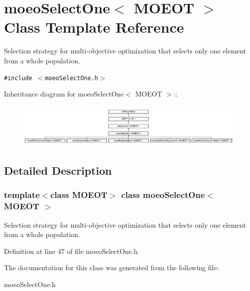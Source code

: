 \section{moeo\-Select\-One$<$ MOEOT $>$ Class Template Reference}
\label{classmoeoSelectOne}
Selection strategy for multi-objective optimization that selects only one element from a whole population.  


{\tt \#include $<$moeo\-Select\-One.h$>$}

Inheritance diagram for moeo\-Select\-One$<$ MOEOT $>$::\begin{figure}[H]
\begin{center}
\leavevmode
\includegraphics[height=2.17899cm]{classmoeoSelectOne}
\end{center}
\end{figure}


\subsection{Detailed Description}
\subsubsection*{template$<$class MOEOT$>$ class moeo\-Select\-One$<$ MOEOT $>$}

Selection strategy for multi-objective optimization that selects only one element from a whole population. 



Definition at line 47 of file moeo\-Select\-One.h.

The documentation for this class was generated from the following file:\begin{CompactItemize}
\item 
moeo\-Select\-One.h\end{CompactItemize}
